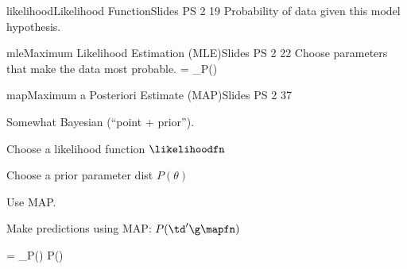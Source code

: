 \documentclass[12pt]{article}
\begin{document}
\begin{sgequationpagedesc}{likelihood}{Likelihood Function}{Slides PS 2 19}{%
Probability of data given this model hypothesis.}
\likelihoodfn
\end{sgequationpagedesc}

\begin{sgequationdesc}{mle}{Maximum Likelihood Estimation (MLE)}{Slides PS 2 22}{%
Choose parameters that make the data most probable.}
\likelihoodest = \argmax_{\theta}P(\td \g \theta)
\end{sgequationdesc}

\begin{sgequationdesc}{map}{Maximum a Posteriori Estimate (MAP)}{Slides PS 2 37}{%
Somewhat Bayesian (``point + prior'').
\begin{packedlist}
\item Choose a likelihood function $\likelihoodfn$
\item Choose a prior parameter dist $P(\theta)$
\item Use MAP.
\item Make predictions using MAP: $P(\td' \g \mapfn)$
\end{packedlist}}
\mapfn = \argmax_{\theta}P(\td \g \theta) P(\theta)
\end{sgequationdesc}
\end{document}
